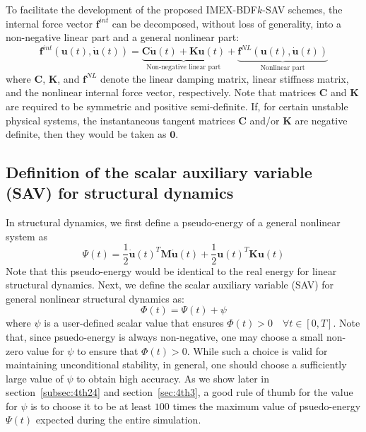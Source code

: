 \documentclass[review]{elsarticle}
\begin{document}
To facilitate the development of the proposed IMEX-BDF$k$-SAV schemes, the internal force vector $\boldsymbol{f}^{int}$ can be decomposed, without loss of generality, into a non-negative linear part and a general nonlinear part:
\begin{equation}
    \boldsymbol{f}^{int}(\boldsymbol{u}(t),\dot{\boldsymbol{u}}(t)) = \underbrace{\boldsymbol{C}\dot{\boldsymbol{u}}(t) + \boldsymbol{K}\boldsymbol{u}(t)}_{\text{Non-negative linear part}} + \underbrace{\boldsymbol{f}^{NL}(\boldsymbol{u}(t),\dot{\boldsymbol{u}}(t))}_{\text{Nonlinear part}}
\end{equation}
where $\boldsymbol{C}$, $\boldsymbol{K}$, and $\boldsymbol{f}^{NL}$ denote the linear damping matrix, linear stiffness matrix, and the nonlinear internal force vector, respectively.
Note that matrices $\boldsymbol{C}$ and $\boldsymbol{K}$ are required to be  symmetric and positive semi-definite.
If, for certain unstable physical systems, the instantaneous tangent matrices $\boldsymbol{C}$ and/or $\boldsymbol{K}$ are negative definite, then they would be taken as $\boldsymbol{0}$.


\subsection{Definition of the scalar auxiliary variable (SAV) for structural dynamics}
In structural dynamics, we first define a pseudo-energy of a general nonlinear system as
\begin{equation}
    \Psi(t) = \frac{1}{2}\dot{\boldsymbol{u}}(t)^T\boldsymbol{M}\dot{\boldsymbol{u}}(t) + \frac{1}{2}\boldsymbol{u}(t)^T\boldsymbol{K}\boldsymbol{u}(t)
    \label{eqn:4thEnergy}
\end{equation}
Note that this pseudo-energy would be identical to the real energy for linear structural dynamics.
Next, we define the scalar auxiliary variable (SAV) for general nonlinear structural dynamics as:
\begin{equation}
    \Phi(t)=\Psi(t)+\psi
    \label{eqn:4thSAV_definition}
\end{equation}
where $\psi$ is a user-defined scalar value that ensures $\Phi(t)>0 \quad \forall t\in[0,T]$.
Note that, since psuedo-energy is always non-negative, one may choose a small non-zero value for $\psi$ to ensure that $\Phi(t)>0$.
While such a choice is valid for maintaining unconditional stability, in general, one should choose a sufficiently large value of $\psi$ to obtain high accuracy.  
As we show later in section~\ref{subsec:4th24} and section~\ref{sec:4th3}, a good rule of thumb for the value for $\psi$ is to choose it to be at least $100$ times the maximum value of psuedo-energy $\Psi(t)$ expected during the entire simulation.  
\end{document}

